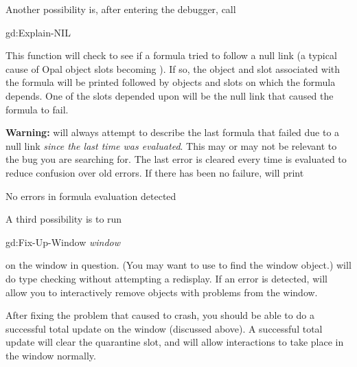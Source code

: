 Another possibility is, after entering the debugger, call
\begin{programexample}
gd:Explain-NIL\value{function}
\end{programexample}
This function
will check to see if a formula tried to follow a
null link 
(a typical cause of Opal object slots becoming ).
If so, the object and slot associated with the formula will be
printed followed by objects and slots on which the
formula depends.
One of the slots depended upon will be the null link that caused
the formula to fail.

{\bf Warning:}  will always
attempt to describe the last formula that failed due to a null
link {\it since the last time  was evaluated}.
This may or may not be relevant to the bug you are searching
for.  The last error is cleared every time  is
evaluated to reduce confusion over old errors.
If there has been no failure,  will print
\begin{programexample}
No errors in formula evaluation detected
\end{programexample}

A third possibility is to run
\begin{programexample}
gd:Fix-Up-Window {\it window}\value{function}
\end{programexample}
on the window in question.  (You may want to use  to
find the window object.)   will do type checking
without attempting a redisplay.  If an error is detected,
 will allow you to interactively remove
objects with problems from the window.

After fixing the problem that caused  to crash, you should be
able to do a successful total update on the window (discussed above).
A successful total update will clear the quarantine slot, and will allow
interactions to take place in the window normally.



